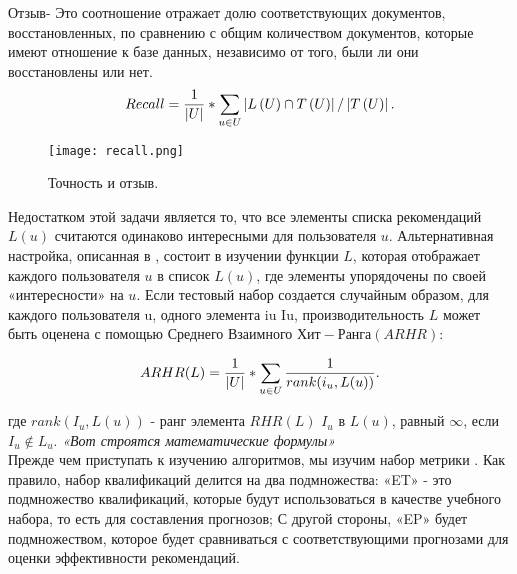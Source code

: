 Отзыв- Это соотношение отражает долю соответствующих документов, восстановленных, по сравнению с общим количеством документов, которые имеют отношение к базе данных, независимо от того, были ли они восстановлены или нет.
\begin{equation}
Recall =\frac{1}{\left | U \right |}*\sum_{u\in U}^{  } \left |L\left ( U \right )\cap  T\left ( U \right ) \right |/\left | T\left ( U \right ) \right |\\.
\label{F:F5}
\end{equation}



\begin{figure}[h]
  \centering
  \texttt{[image: recall.png]}
  \caption{Точность и отзыв.}
  \label{image:scheme7}
\end{figure}



Недостатком этой задачи является то, что все элементы списка рекомендаций $L\left ( u \right )$ считаются одинаково интересными для пользователя $u$. Альтернативная настройка, описанная в \cite{topn}, состоит в изучении функции $L$, которая отображает каждого пользователя $u$ в список $L\left ( u \right )$, где элементы упорядочены по своей «интересности» на $u$. Если тестовый набор создается случайным образом, для каждого пользователя u, одного элемента iu Iu, производительность $L$ может быть оценена с помощью Среднего Взаимного $Хит-Ранга (ARHR)$:


\begin{equation}
ARHR(L)=\frac{1}{\left | U \right |}*\sum_{u\in U}^{  } \frac{1}{rank(i_{u},L(u))}\\.
\label{F:F6}
\end{equation}

где $rank \left ( I_{u},L\left (u  \right ) \right )$ - ранг элемента $RHR(L)$ $I_{u}$ в $L\left (u  \right )$, равный $\infty$, если $I_{u}\notin  L_{u}$.
\textit{«Вот строятся математические формулы»}\\



Прежде чем приступать к изучению алгоритмов, мы изучим набор метрики \cite{topn}. Как правило, набор квалификаций делится на два подмножества: «ET» - это подмножество квалификаций, которые будут использоваться в качестве учебного набора, то есть для составления прогнозов; С другой стороны, «EP» будет подмножеством, которое будет сравниваться с соответствующими прогнозами для оценки эффективности рекомендаций.




